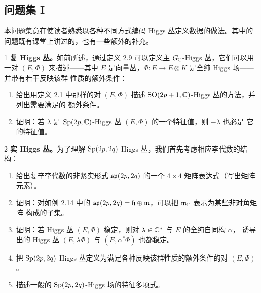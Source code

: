 
\subsection{问题集 I}

本问题集意在使读者熟悉以各种不同方式编码 Higgs 丛定义数据的做法。其中的问题既有课堂上讲过的，也有一些额外的补充。

\begin{prob}{1}
\textbf{复 Higgs 丛。}如前所述，通过定义 2.9 可以定义主 $G_{\mathbb{C}}$-Higgs 丛，它们可以用一对 $(E,\Phi)$
来描述——其中 $E$ 是向量丛，$\Phi\colon E\to E\otimes K$ 是全纯 Higgs 场——并带有若干反映该群
性质的额外条件：
\begin{enumerate}[label=(\roman*),leftmargin=2.2em]
\item 给出用定义 2.1 中那样的对 $(E,\Phi)$ 描述 $\mathrm{SO}(2p+1,\mathbb{C})$-Higgs 丛的方法，并列出需要满足的
  额外条件。
\item 证明：若 $\lambda$ 是 $\mathrm{Sp}(2p,\mathbb{C})$-Higgs 丛 $(E,\Phi)$ 的一个特征值，则 $-\lambda$ 也必是
  它的特征值。
\end{enumerate}
\end{prob}

\begin{prob}{2}
\textbf{实 Higgs 丛。}为了理解 $\mathrm{Sp}(2p,2q)$-Higgs 丛，我们首先考虑相应李代数的结构：
\begin{enumerate}[label=(\roman*),leftmargin=2.2em]
\item 给出复辛李代数的非紧实形式 $\mathfrak{sp}(2p,2q)$ 的一个 $4\times4$ 矩阵表达式（写出矩阵元素）。
\item 证明：对如例 2.14 中的 $\mathfrak{sp}(2p,2q)=\mathfrak{h}\oplus\mathfrak{m}$，可以把 $\mathfrak{m}_{\mathbb{C}}$ 表示为某些非对角矩阵
  构成的子集。
\item 证明：若 Higgs 丛 $(E,\Phi)$ 稳定，则对 $\lambda\in\mathbb{C}^{*}$ 与 $E$ 的全纯自同构 $\alpha$，
  诱导出的 Higgs 丛 $(E,\lambda\Phi)$ 与 $(E,\alpha^{*}\Phi)$ 也都稳定。
\item 把 $\mathrm{Sp}(2p,2q)$-Higgs 丛定义为满足各种反映该群性质的额外条件的对 $(E,\Phi)$。
\item 描述一般的 $\mathrm{Sp}(2p,2q)$-Higgs 场的特征多项式。
\end{enumerate}
\end{prob}

